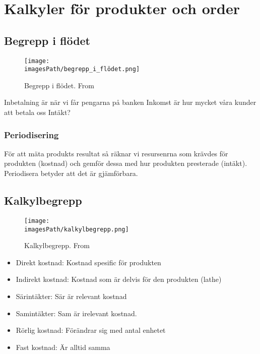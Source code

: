 %
%
%
%

\section{Kalkyler för produkter och order}
\subsection{Begrepp i flödet}
\begin{figure}[H]
    \centering
    \texttt{[image: \\imagesPath/begrepp\_i\_flödet.png]}
    \caption{Begrepp i flödet. From \cite{im}}
\end{figure}

Inbetalning är när vi får pengarna på banken 
Inkomst är hur mycket våra kunder att betala oss 
Intäkt?

\subsubsection{Periodisering}
För att mäta produkts resultat så räknar vi resursenrna som krävdes för produkten 
(kostnad) och gemför dessa med hur produkten presterade (intäkt).
Periodisera betyder att det är gjämförbara. 

\subsection{Kalkylbegrepp}
\begin{figure}[H]
    \centering
    \texttt{[image: \\imagesPath/kalkylbegrepp.png]}
    \caption{Kalkylbegrepp. From \cite{im}}
\end{figure}
\begin{itemize}
    \item Direkt kostnad: Kostnad spesific för produkten
    \item Indirekt kostnad: Kostnad som är delvis för den produkten (lathe)
    \item Särintäkter: Sär är relevant kostnad 
    \item Samintäkter: Sam är irelevant kostnad.  
    \item Rörlig kostnad: Förändrar sig med antal enhetet
    \item Fast kostnad: Är alltid samma
\end{itemize}


